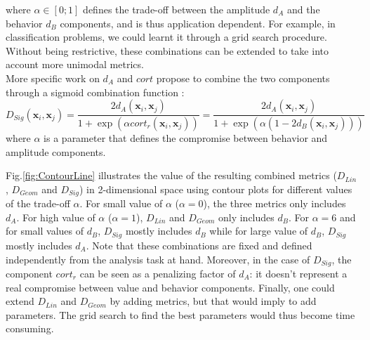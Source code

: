 \noindent where $\alpha \in [0;1]$ defines the trade-off between the amplitude $d_A$ and the behavior $d_B$ components, and is thus application dependent. For example, in classification problems, we could learnt it through a grid search procedure. Without being restrictive, these combinations can be extended to take into account more unimodal metrics. \\
More specific work on $d_A$ and $cort$ propose to combine the two components through a sigmoid combination function \cite{AhlameDouzal-Chouakria2011}:
\begin{equation}	
D_{Sig}(\textbf{x}_i,\textbf{x}_j) = \frac{2d_A(\textbf{x}_i,\textbf{x}_j)}{1+\exp(\alpha cort_r(\textbf{x}_i,\textbf{x}_j))}
= \frac{2d_A(\textbf{x}_i,\textbf{x}_j)}{1+\exp(\alpha (1-2d_B(\textbf{x}_i,\textbf{x}_j)))}
\label{eq:DSig}
\end{equation}
\noindent where $\alpha$ is a parameter that defines the compromise between behavior and amplitude components.

Fig.\ref{fig:ContourLine} illustrates the value of the resulting combined metrics ($D_{Lin}$, $D_{Geom}$ and $D_{Sig}$) in 2-dimensional space using contour plots for different values of the trade-off $\alpha$. For small value of $\alpha$ ($\alpha=0$), the three metrics only includes $d_A$. For high value of $\alpha$ ($\alpha=1$), $D_{Lin}$ and $D_{Geom}$ only includes $d_B$. For $\alpha=6$ and for small values of $d_B$, $D_{Sig}$ mostly includes $d_B$ while for large value of $d_B$, $D_{Sig}$ mostly includes $d_A$. 
Note that these combinations are fixed and defined independently from the analysis task at hand. Moreover, in the case of $D_{Sig}$, 
the component $cort_r$ can be seen as a penalizing factor of $d_A$: it doesn't represent a real compromise between value and behavior components. Finally, one could extend $D_{Lin}$ and $D_{Geom}$ by adding metrics, but that would imply to add parameters. The grid search to find the best parameters would thus become time consuming.

